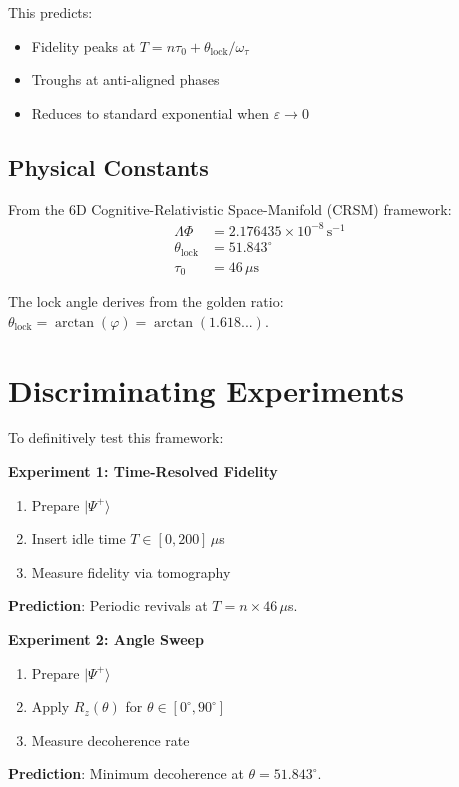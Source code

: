 \documentclass[11pt,twocolumn]{article}
\begin{document}
This predicts:
\begin{itemize}
\item Fidelity peaks at $T = n\tau_0 + \theta_{\mathrm{lock}}/\omega_\tau$
\item Troughs at anti-aligned phases
\item Reduces to standard exponential when $\varepsilon \to 0$
\end{itemize}

\subsection{Physical Constants}

From the 6D Cognitive-Relativistic Space-Manifold (CRSM) framework:
\begin{align}
\Lambda\Phi &= 2.176435 \times 10^{-8}\,\mathrm{s}^{-1} \\
\theta_{\mathrm{lock}} &= 51.843^\circ \\
\tau_0 &= 46\,\mu\mathrm{s}
\end{align}

The lock angle derives from the golden ratio: $\theta_{\mathrm{lock}} = \arctan(\varphi) = \arctan(1.618...)$.

\section{Discriminating Experiments}

To definitively test this framework:

\textbf{Experiment 1: Time-Resolved Fidelity}
\begin{enumerate}
\item Prepare $|\Psi^+\rangle$
\item Insert idle time $T \in [0, 200]\,\mu$s
\item Measure fidelity via tomography
\end{enumerate}

\textbf{Prediction}: Periodic revivals at $T = n \times 46\,\mu$s.

\textbf{Experiment 2: Angle Sweep}
\begin{enumerate}
\item Prepare $|\Psi^+\rangle$
\item Apply $R_z(\theta)$ for $\theta \in [0^\circ, 90^\circ]$
\item Measure decoherence rate
\end{enumerate}

\textbf{Prediction}: Minimum decoherence at $\theta = 51.843^\circ$.
\end{document}
